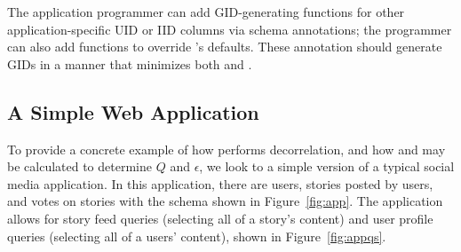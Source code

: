 The application programmer can add GID-generating functions for other application-specific UID or
IID columns via schema annotations; the programmer can also add functions to override \sys's
defaults.  These annotation should generate GIDs in a manner that minimizes both \premnant{} and
\plinked{}.


\subsection{A Simple Web Application}
To provide a concrete example of how \sys{} performs decorrelation, and how \plinked{} and
\premnant{} may be calculated to determine $Q$ and $\epsilon$, we look to a simple version of a typical social media 
application.
In this application, there are users, stories posted by users, and votes on stories with the schema
shown in Figure~\ref{fig:app}.
The application allows for story feed queries (selecting all of a story's content) and user profile
queries (selecting all of a users' content), shown in Figure~\ref{fig:appqs}.

